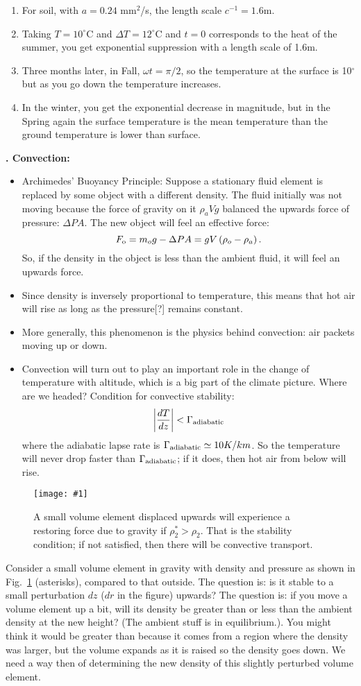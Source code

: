 \documentclass[11pt]{book}
\def\be{\begin{equation}}
\def\ee{\end{equation}}
\newcommand{\sfig}[2]{
\texttt{[image: \#1]}
        }
\newcommand{\Sjpg}[2]{
   \begin{figure}[thbp]
   \begin{center}
    \sfig{../Figures/#1.jpg}{0.6\columnwidth}
    \caption{{\small #2}}
    \label{fig:#1}
     \end{center}
   \end{figure}
}
\newcommand{\rf}[1]{\ref{fig:#1}}
\newcommand\comment[1]{\fbox{ \parbox{.5\linewidth} {\bf
Comment: #1
		}
}
}
\newcommand\bei{\begin{itemize}}
\newcommand\eei{\end{itemize}}
\newcommand\bee{\begin{enumerate}}
\newcommand\eee{\end{enumerate}}
\newcounter{lectureno}
\newcounter{secno}
\newcommand\lsection[1]{
\addtocounter{secno}{1}
{\bf \arabic{lectureno}.\alph{secno} #1:}}
\begin{document}
\bee
\item For soil, with $a=0.24$ mm$^2$/s, the length scale $c^{-1}= 1.6$m. 
\item Taking $T=10^\circ$C and $\Delta T=12^\circ$C and $t=0$ corresponds to the heat of the summer, you get exponential suppression with a length scale of 1.6m.
\item Three months later, in Fall, $\omega t=\pi/2$, so the temperature at the surface is 10$^\circ$ but as you go down the temperature increases.
\item In the winter, you get the exponential decrease in magnitude, but in the Spring again the surface temperature is the mean temperature than the ground temperature is lower than surface.
\eee



\lsection{Convection}

\bei
\item Archimedes' Buoyancy Principle: Suppose a stationary fluid element is replaced by some object with a different density. The fluid initially was not moving because the force of gravity on it $\rho_aVg$ balanced the upwards force of pressure: $\Delta P A$. The new object will feel an effective force:
\be
F_{\rm o} = m_og - \Delta PA = gV\left(\rho_o-\rho_a\right).\ee
So, if the density in the object is less than the ambient fluid, it will feel an upwards force. 
\item Since density is inversely proportional to temperature, this means that hot air will rise as long as the pressure[?] remains constant.
\item More generally, this phenomenon is the physics behind convection: air packets moving up or down. 
\item Convection will turn out to play an important role in the change of temperature with altitude, which is a big part of the climate picture. Where are we headed?
Condition for convective stability:
\be
 \left |\frac{dT}{dz} \right| < \Gamma_{\rm adiabatic} \ee
where the adiabatic lapse rate is 
$\Gamma_{\rm adiabatic} \simeq 10K/km$. So the temperature will never drop faster than $\Gamma_{\rm adiabatic}$; if it does, then hot air from below will rise.
\eei

\Sjpg{convection}{A small volume element displaced upwards will experience a restoring force due to gravity if $\rho_2^*>\rho_2$. That is the stability condition; if not satisfied, then there will be convective transport.}
Consider a small volume element in gravity with density and pressure as shown in Fig.~\rf{convection} (asterisks), compared to that outside. The question is: is it stable to a small perturbation $dz$ ($dr$ in the figure) upwards? The question is: if you move a volume element up a bit, will its density be greater than or less than the ambient density at the new height? (The ambient stuff is in equilibrium.). You might think it would be greater than because it comes from a region where the density was larger, but the volume expands as it is raised so the density goes down. We need a way then of determining the new density of this slightly perturbed volume element.
\end{document}
